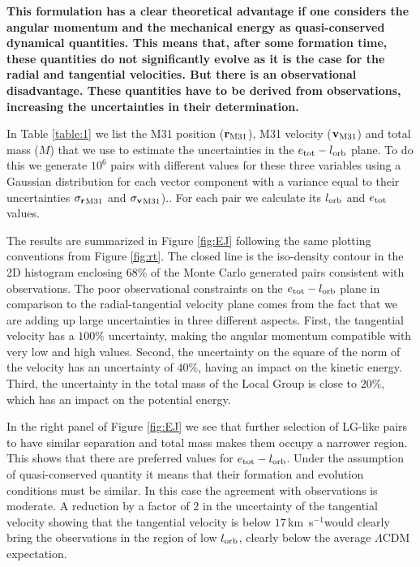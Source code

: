 \documentclass{emulateapj}
\newcommand{\kms}{\,km~s$^{-1}$}
\begin{document}
{\bf This formulation has a clear theoretical advantage if one considers the angular momentum and the mechanical energy as quasi-conserved dynamical quantities. This means that, after some formation time, these quantities do not significantly evolve as it is the case for the radial and tangential velocities. But there is an observational disadvantage. These quantities have to be derived from observations, increasing the uncertainties in their determination.}

In Table \ref{table:1} we list the M31 position (${\bf r}_{\rm M31}$), M31 velocity (${\bf v}_{\rm M31}$) and total mass ($M$) that we use to estimate the uncertainties in the $e_{\rm tot}-l_{\rm orb}$ plane. To do this we generate $10^6$ pairs with different values for these three variables using a Gaussian distribution for each vector component with a variance equal to their uncertainties ${\sigma_{\bf r}}_{\rm M31}$ and ${\sigma_{\bf v}}_{\rm M31}$).. For each pair we calculate its $l_{\rm orb}$ and $e_{\rm tot}$ values.  

The results are summarized in Figure \ref{fig:EJ} following the same plotting conventions from Figure \ref{fig:rt}. The closed line is the iso-density contour in the 2D histogram enclosing $68\%$ of the Monte Carlo generated pairs consistent with observations. The poor observational constraints on the $e_{\rm tot}-l_{\rm orb}$ plane in comparison to the radial-tangential velocity plane comes from the fact that we are adding up large uncertainties in three different aspects. First, the tangential velocity has a $100\%$ uncertainty, making the angular momentum compatible with very low and high values. Second, the uncertainty on the square of the norm of the velocity has an uncertainty of $40\%$, having an impact on the kinetic energy. Third, the uncertainty in the total mass of the Local Group is close to $20\%$, which has an impact on the potential energy. 

In the right panel of Figure \ref{fig:EJ} we see that further selection of LG-like pairs to have similar separation and total mass makes them occupy a narrower region. This shows that there are preferred values for $e_{\rm tot}-l_{\rm orb}$. Under the assumption of quasi-conserved quantity it means that their formation and evolution conditions must be similar. In this case the agreement with observations is moderate. A reduction by a factor of $2$ in the uncertainty of the tangential velocity showing that the tangential velocity is below $17$\kms would clearly bring the observations in the region of low $l_{\rm orb}$, clearly below the average $\Lambda$CDM expectation.
\end{document}
